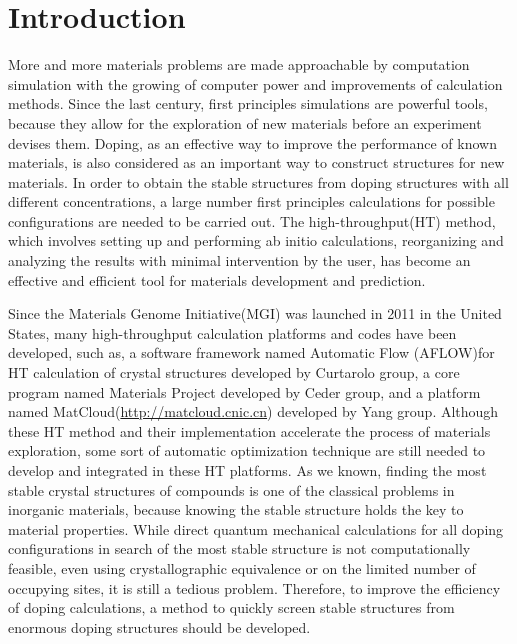 \documentclass[aps,preprint,amsmath,amssymb]{revtex4}
\begin{document}
\section{Introduction}
More and more materials problems are made approachable by computation simulation
with the growing of computer power and improvements of calculation methods.
Since the last century, first principles simulations are powerful tools, because they allow for
the exploration of new materials before an experiment devises them. Doping, as an effective way
to improve the performance of known materials, is also considered as an important way to construct
structures for new materials.
In order to obtain the stable structures from doping structures with all different concentrations,
a large number first principles calculations for possible configurations are needed to be carried out.
The high-throughput(HT) method, which involves setting up and performing ab initio calculations,
reorganizing and analyzing the results with minimal intervention by the user,
has become an effective and efficient tool for materials development and prediction\cite{Setyawan2010}.

Since the Materials Genome Initiative(MGI) was launched in 2011 in the United States\cite{KalilTomAndWadia2011},
many high-throughput calculation platforms and codes have been developed, such as,
a software framework named Automatic Flow (AFLOW)\cite{Curtarolo2012}for
HT calculation of crystal structures developed by Curtarolo group,
a core program named Materials Project\cite{Jain2013} developed by Ceder group,
and a platform named MatCloud(\url{http://matcloud.cnic.cn}) developed by Yang group.
Although these HT method and their implementation accelerate the process of materials exploration,
some sort of automatic optimization technique are still needed to develop and integrated in these HT platforms.
As we known, finding the most stable crystal structures of compounds is one of the classical problems in
inorganic materials, because knowing the stable structure holds the key to material properties.
While direct quantum mechanical calculations for all doping configurations in search of the most
stable structure is not computationally feasible,
even using crystallographic equivalence or on the limited number of occupying sites, it is still a tedious problem.
Therefore, to improve the efficiency of doping calculations,
a method to quickly screen stable structures from enormous doping structures should be developed.
\end{document}
